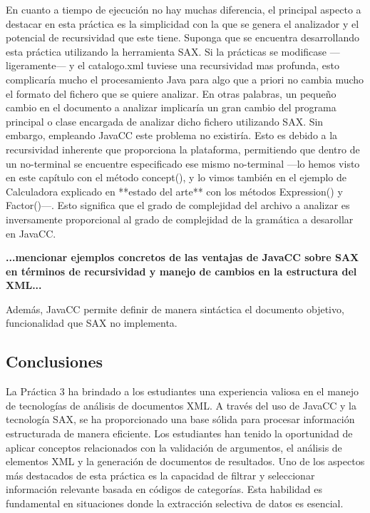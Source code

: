 En cuanto a tiempo de ejecución no hay muchas diferencia, el principal aspecto a destacar en esta práctica es la simplicidad con la que se genera el analizador y el potencial de recursividad que este tiene. 
Suponga que se encuentra desarrollando esta práctica utilizando la herramienta SAX. Si la prácticas se modificase ---ligeramente--- y el catalogo.xml tuviese una recursividad mas profunda, esto complicaría mucho el procesamiento Java para algo que a priori no cambia mucho el formato del fichero que se quiere analizar. En otras palabras, un pequeño cambio en el documento a analizar implicaría un gran cambio del programa principal o clase encargada de analizar dicho fichero utilizando SAX.
Sin embargo, empleando JavaCC este problema no existiría. Esto es debido a la recursividad inherente que proporciona la plataforma, permitiendo que dentro de un no-terminal se encuentre especificado ese mismo no-terminal ---lo hemos visto en este capítulo con el método concept(), y lo vimos también en el ejemplo de Calculadora explicado en **estado del arte** con los métodos Expression() y Factor()---. Esto significa que el grado de complejidad del archivo a analizar es inversamente proporcional al grado de complejidad de la gramática a desarollar en JavaCC.

\textbf{...mencionar ejemplos concretos de las ventajas de JavaCC sobre SAX en términos de recursividad y manejo de cambios en la estructura del XML...}

Además, JavaCC permite definir de manera sintáctica el documento objetivo, funcionalidad que SAX no implementa.

\subsection{Conclusiones}

\noindent La Práctica 3 ha brindado a los estudiantes una experiencia valiosa en el manejo de tecnologías de análisis de documentos XML. A través del uso de JavaCC y la tecnología SAX, se ha proporcionado una base sólida para procesar información estructurada de manera eficiente. Los estudiantes han tenido la oportunidad de aplicar conceptos relacionados con la validación de argumentos, el análisis de elementos XML y la generación de documentos de resultados.
Uno de los aspectos más destacados de esta práctica es la capacidad de filtrar y seleccionar información relevante basada en códigos de categorías. Esta habilidad es fundamental en situaciones donde la extracción selectiva de datos es esencial.


